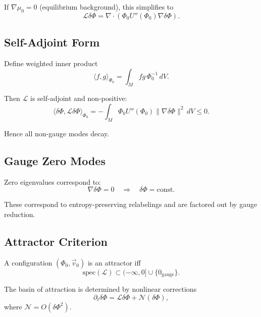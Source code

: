 \documentclass[11pt]{article}
\begin{document}
If $\nabla\mu_0 = 0$ (equilibrium background), this simplifies to
\begin{equation}
\mathcal{L}\delta\Phi
=
\nabla\cdot\!\left(
\Phi_0 U''(\Phi_0)\nabla\delta\Phi
\right).
\end{equation}

\subsection*{Self-Adjoint Form}

Define weighted inner product
\begin{equation}
\langle f,g\rangle_{\Phi_0}
=
\int_M f g \,\Phi_0^{-1} \, dV.
\end{equation}

Then $\mathcal{L}$ is self-adjoint and non-positive:
\begin{equation}
\langle \delta\Phi, \mathcal{L}\delta\Phi\rangle_{\Phi_0}
=
-
\int_M
\Phi_0 U''(\Phi_0)
\lVert\nabla\delta\Phi\rVert^2
\, dV
\le 0.
\end{equation}

Hence all non-gauge modes decay.

\subsection*{Gauge Zero Modes}

Zero eigenvalues correspond to:
\begin{equation}
\nabla\delta\Phi = 0
\quad \Rightarrow \quad
\delta\Phi = \text{const}.
\end{equation}

These correspond to entropy-preserving relabelings and are factored out by gauge reduction.

\subsection*{Attractor Criterion}

A configuration $(\Phi_0,\vec{v}_0)$ is an attractor iff
\begin{equation}
\mathrm{spec}(\mathcal{L}) \subset (-\infty,0] \cup \{0_{\text{gauge}}\}.
\end{equation}

The basin of attraction is determined by nonlinear corrections
\begin{equation}
\partial_t \delta\Phi
=
\mathcal{L}\delta\Phi
+
\mathcal{N}(\delta\Phi),
\end{equation}
where $\mathcal{N}=O(\delta\Phi^2)$.
\end{document}
